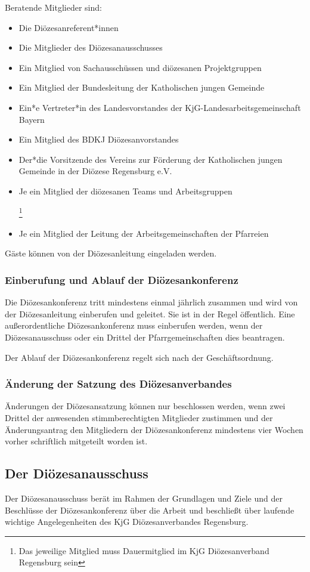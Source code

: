 \documentclass[12pt]{report}
\newcommand{\footnoteremember}[2]{
  \footnote{#2}
  \newcounter{#1}
  \setcounter{#1}{\value{footnote}}
}
\newcommand{\footnoterecall}[1]{%
  \footnotemark[\value{#1}]
}
\begin{document}
\begin{flushleft}
Beratende Mitglieder sind:
\begin{itemize}
  \item Die Diözesanreferent*innen
  \item Die Mitglieder des Diözesanausschusses
  \item Ein Mitglied von Sachausschüssen und diözesanen Projektgruppen
  \item Ein Mitglied der Bundesleitung der Katholischen jungen Gemeinde
  \item Ein*e Vertreter*in des Landesvorstandes der KjG-Landesarbeitsgemeinschaft Bayern
  \item Ein Mitglied des BDKJ Diözesanvorstandes
  \item Der*die Vorsitzende des Vereins zur Förderung der Katholischen jungen Gemeinde in der
        Diözese Regensburg e.V.
  \item Je ein Mitglied der diözesanen Teams und Arbeitsgruppen
        \footnoteremember{Dauermitglied}{Das jeweilige Mitglied muss Dauermitglied im KjG Diözesanverband Regensburg sein}
  \item Je ein Mitglied der Leitung der Arbeitsgemeinschaften der Pfarreien \footnoterecall{Dauermitglied}
\end{itemize}

Gäste können von der Diözesanleitung eingeladen werden.
\subsubsection{Einberufung und Ablauf der Diözesankonferenz}
Die Diözesankonferenz tritt mindestens einmal jährlich zusammen und wird von der Diözesanleitung
einberufen und geleitet. Sie ist in der Regel öffentlich.
Eine außerordentliche Diözesankonferenz muss einberufen werden, wenn der Diözesanausschuss oder ein
Drittel der Pfarrgemeinschaften dies beantragen.

Der Ablauf der Diözesankonferenz regelt sich nach der Geschäftsordnung.

\subsubsection{Änderung der Satzung des Diözesanverbandes}
Änderungen der Diözesansatzung können nur beschlossen werden, wenn zwei Drittel der anwesenden
stimmberechtigten Mitglieder zustimmen und der Änderungsantrag den Mitgliedern der
Diözesankonferenz mindestens vier Wochen vorher schriftlich mitgeteilt worden ist.

\subsection{Der Diözesanausschuss}
Der Diözesanausschuss berät im Rahmen der Grundlagen und Ziele und der Beschlüsse der Diözesankonferenz
über die Arbeit und beschließt über laufende wichtige Angelegenheiten des KjG Diözesanverbandes Regensburg.


\end{flushleft}
\end{document}
